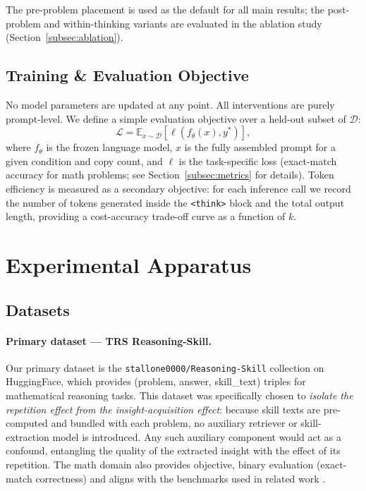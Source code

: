 The pre-problem placement is used as the default for all main results; the post-problem
and within-thinking variants are evaluated in the ablation study
(Section~\ref{subsec:ablation}).

\subsection{Training \& Evaluation Objective}
\label{subsec:objective}

No model parameters are updated at any point.
All interventions are purely prompt-level.
We define a simple evaluation objective over a held-out subset of $\mathcal{D}$:
\begin{equation}
  \mathcal{L} = \mathbb{E}_{x \sim \mathcal{D}} \left[ \ell\!\left(f_\theta(x), y^*\right) \right],
  \label{eq:objective}
\end{equation}
where $f_\theta$ is the frozen language model, $x$ is the fully assembled prompt for a
given condition and copy count, and $\ell$ is the task-specific loss (exact-match accuracy
for math problems; see Section~\ref{subsec:metrics} for details).
Token efficiency is measured as a secondary objective: for each inference call we record
the number of tokens generated inside the \texttt{<think>} block and the total output
length, providing a cost-accuracy trade-off curve as a function of $k$.

\section{Experimental Apparatus}
\label{sec:apparatus}

\subsection{Datasets}
\label{subsec:datasets}

\paragraph{Primary dataset — TRS Reasoning-Skill.}
Our primary dataset is the \texttt{stallone0000/Reasoning-Skill} collection on HuggingFace,
which provides (problem, answer, skill\_text) triples for mathematical reasoning tasks.
This dataset was specifically chosen to \emph{isolate the repetition effect from the
insight-acquisition effect}: because skill texts are pre-computed and bundled with each
problem, no auxiliary retriever or skill-extraction model is introduced.
Any such auxiliary component would act as a confound, entangling the quality of the
extracted insight with the effect of its repetition.
The math domain also provides objective, binary evaluation (exact-match correctness)
and aligns with the benchmarks used in related work
\cite{leviathan2025prompt, wang2025harm, didolkar2025metacognitive}.

